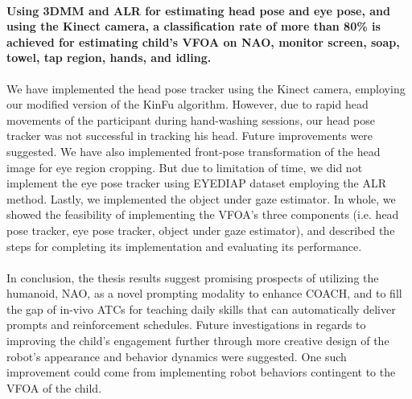 \paragraph{Using 3DMM and ALR for estimating head pose and eye pose, and using the Kinect camera, a classification rate of more than 80\% is achieved for estimating child's VFOA on NAO, monitor screen, soap, towel, tap region, hands, and idling.}
We have implemented the head pose tracker using the Kinect camera, employing our modified version of the KinFu algorithm.  However, due to rapid head movements of the participant during hand-washing sessions, our head pose tracker was not successful in tracking his head.  Future improvements were suggested.  We have also implemented front-pose transformation of the head image for eye region cropping.  But due to limitation of time, we did not implement the eye pose tracker using EYEDIAP dataset employing the ALR method.  Lastly, we implemented the object under gaze estimator.  In whole, we showed the feasibility of implementing the VFOA's three components (i.e. head pose tracker, eye pose tracker, object under gaze estimator), and described the steps for completing its implementation and evaluating its performance.
\\
\\
In conclusion, the thesis results suggest promising prospects of utilizing the humanoid, NAO, as a novel prompting modality to enhance COACH, and to fill the gap of in-vivo ATCs for teaching daily skills that can automatically deliver prompts and reinforcement schedules.  Future investigations in regards to improving the child's engagement further through more creative design of the robot's appearance and behavior dynamics were suggested.  One such improvement could come from implementing robot behaviors contingent to the VFOA of the child.